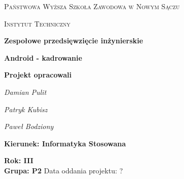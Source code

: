 \begin{titlepage}
\centering
{\scshape\LARGE Państwowa Wyższa Szkoła Zawodowa w Nowym Sączu \par}
\vspace{0.3cm}
{\scshape\Large Instytut Techniczny \par}
\vspace{1cm}
\begin{center}
{\huge \bfseries Zespołowe przedsięwzięcie inżynierskie\par}
\end{center}
\vspace{2cm}
\noindent\linia
\begin{center}
{\huge \bfseries Android - kadrowanie \par}
\end{center}
\linia
\vspace{2cm}
{\Large\bfseries Projekt opracowali\par}
{\Large\itshape Damian Pulit\par}
{\Large\itshape Patryk Kubisz\par}
{\Large\itshape Paweł Bodziony\par}
\vspace{1.5cm}
{\Large\bfseries Kierunek: Informatyka Stosowana\par}
{\Large\bfseries Rok: III}\\
{\Large\bfseries Grupa: P2}
\vfill
Data oddania projektu: ?
\end{titlepage}